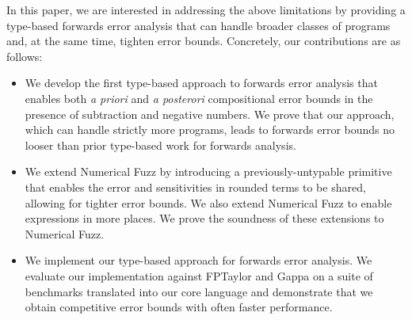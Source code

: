 In this paper, we are interested in addressing the above limitations by
providing a type-based forwards error analysis that can handle broader classes
of programs and, at the same time, tighten error bounds. 
Concretely, our contributions are as follows:
\begin{itemize}
  \item We develop the first type-based approach to forwards error analysis that
    enables both \textit{a priori} and \textit{a posterori} compositional error
    bounds in the presence of subtraction and negative numbers. We prove that
    our approach, which can handle strictly more programs, leads to forwards
    error bounds no looser than prior type-based work for forwards analysis.

  \item We extend Numerical Fuzz by introducing a previously-untypable primitive
    that enables the error and sensitivities in rounded terms to be shared,
    allowing for tighter error bounds. We also extend Numerical Fuzz to enable
    expressions in more places. We prove the soundness of these extensions to
    Numerical Fuzz.

  \item We implement our type-based approach for forwards error analysis. We
    evaluate our implementation against FPTaylor and Gappa on a suite of
    benchmarks translated into our core language and demonstrate that we obtain
    competitive error bounds with often faster performance.
\end{itemize}



